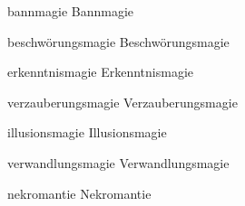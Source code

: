\expandafter\def\csname school@bannmagie@color\endcsname{bannmagie}
\expandafter\def\csname school@bannmagie@icon\endcsname{\faShield*}
\expandafter\def\csname school@bannmagie@name\endcsname{Bannmagie}

\expandafter\def\csname school@beschwörungsmagie@color\endcsname{beschwörungsmagie}
\expandafter\def\csname school@beschwörungsmagie@icon\endcsname{\faMagic}
\expandafter\def\csname school@beschwörungsmagie@name\endcsname{Beschwörungsmagie}

\expandafter\def\csname school@erkenntnismagie@color\endcsname{erkenntnismagie}
\expandafter\def\csname school@erkenntnismagie@icon\endcsname{\faEye}
\expandafter\def\csname school@erkenntnismagie@name\endcsname{Erkenntnismagie}

\expandafter\def\csname school@verzauberungsmagie@color\endcsname{verzauberungsmagie}
\expandafter\def\csname school@verzauberungsmagie@icon\endcsname{\faRecycle}
\expandafter\def\csname school@verzauberungsmagie@name\endcsname{Verzauberungsmagie}

\expandafter\def\csname school@illusionsmagie@color\endcsname{illusionsmagie}
\expandafter\def\csname school@illusionsmagie@icon\endcsname{\faHatWizard}
\expandafter\def\csname school@illusionsmagie@name\endcsname{Illusionsmagie}

\expandafter\def\csname school@verwandlungsmagie@color\endcsname{verwandlungsmagie}
\expandafter\def\csname school@verwandlungsmagie@icon\endcsname{\faRecycle}
\expandafter\def\csname school@verwandlungsmagie@name\endcsname{Verwandlungsmagie}

\expandafter\def\csname school@nekromantie@color\endcsname{nekromantie}
\expandafter\def\csname school@nekromantie@icon\endcsname{\faSkullCrossbones}
\expandafter\def\csname school@nekromantie@name\endcsname{Nekromantie}

\newcommand{\schoolcolor}[1]{%
  \csname school@#1@color\endcsname
}
\newcommand{\schoolicon}[1]{%
  \csname school@#1@icon\endcsname
}
\newcommand{\schoolname}[1]{%
  \csname school@#1@name\endcsname
}


\newcommand{\actionicon}{\faClock}
\newcommand{\rangeicon}{\faRulerHorizontal}
\newcommand{\saveicon}{\faBullseye}
\newcommand{\durationicon}{\faHourglassHalf}

\usepackage{xstring}

